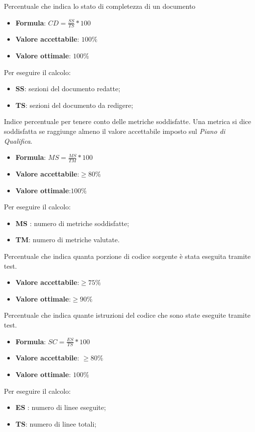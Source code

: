 Percentuale che indica lo stato di completezza di un documento
\begin{itemize}
    \item \textbf{Formula}: $CD=\frac{SS}{TS}*100$
    \item \textbf{Valore accettabile}: $100\%$
    \item \textbf{Valore ottimale}: $100\%$
\end{itemize} 
Per eseguire il calcolo:
\begin{itemize}
    \item \textbf{SS}: sezioni del documento redatte;
    \item \textbf{TS}: sezioni del documento da redigere;
\end{itemize} 


Indice percentuale per tenere conto delle metriche soddisfatte. Una
metrica si dice soddisfatta se raggiunge almeno il valore accettabile imposto sul \textit{Piano di Qualifica}.
\begin{itemize}
    \item \textbf{Formula}: $MS = \frac{MS}{TM}*100$
    \item \textbf{Valore accettabile}:$\geq80\%$
    \item \textbf{Valore ottimale}:$100\%$
\end{itemize}  
Per eseguire il calcolo:
\begin{itemize}
    \item \textbf{MS} : numero di metriche soddisfatte;
    \item \textbf{TM}: numero di metriche valutate.
\end{itemize}

Percentuale che indica quanta porzione di codice sorgente è stata eseguita tramite test.
\begin{itemize}
    \item \textbf{Valore accettabile}:$\geq75\%$
    \item \textbf{Valore ottimale}:$\geq90\%$
\end{itemize} 

Percentuale che indica quante istruzioni del codice che sono state eseguite tramite test.
\begin{itemize}
    \item \textbf{Formula}: $SC = \frac{ES}{TS}*100$
    \item \textbf{Valore accettabile}: $\geq80\%$
    \item \textbf{Valore ottimale}: $100\%$
\end{itemize}  
Per eseguire il calcolo:
\begin{itemize}
    \item \textbf{ES} : numero di linee eseguite;
    \item \textbf{TS}: numero di linee totali;
\end{itemize}

